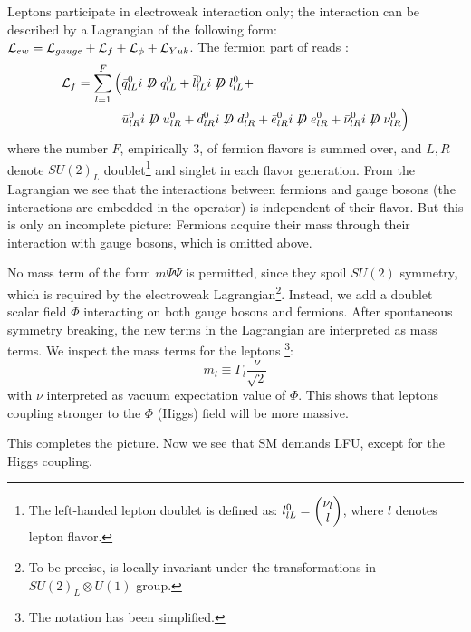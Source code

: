 Leptons participate in electroweak interaction only;
the interaction can be described by a Lagrangian of the following form:
$\mathcal{L}_{ew} = \mathcal{L}_{gauge} + \mathcal{L}_{f} + \mathcal{L}_{\phi} + \mathcal{L}_{Yuk}$.
The fermion part of  reads \cite{Langacker:2010zza}:
\begin{align*}
    \Lden{f} = \sum_{l = 1}^F \Big(
        & \bar{\spin{q}}^0_{lL} i \fsl{D} \spin{q}^0_{lL} +
          \bar{\spin{l}}^0_{lL} i \fsl{D} \spin{l}^0_{lL} + \\
        & \bar{u}^0_{lR} i \fsl{D} u^0_{lR} +
          \bar{d}^0_{lR} i \fsl{D} d^0_{lR} +
          \bar{e}^0_{lR} i \fsl{D} e^0_{lR} +
          \bar{\nu}^0_{lR} i \fsl{D} \nu^0_{lR}
    \Big)
\end{align*}
where the number $F$, empirically 3, of fermion flavors is summed over, and
$L,R$ denote $SU(2)_L$ doublet\footnote{
    The left-handed lepton doublet is defined as:
    $l^0_{lL} = \begin{pmatrix} \nu_l \\ l \end{pmatrix}$,
    where $l$ denotes lepton flavor.
}
and singlet in each flavor generation.
From the Lagrangian we see that the interactions between fermions and gauge
bosons (the interactions are embedded in the  operator) is independent
of their flavor.
But this is only an incomplete picture:
Fermions acquire their mass through their interaction with gauge bosons, which
is omitted above.

No mass term of the form $m \overline{\Psi} \Psi$ is permitted, since they
spoil $SU(2)$ symmetry, which is required by the electroweak
Lagrangian\footnote{
    To be precise,  is locally invariant under the transformations in
    $SU(2)_L \otimes U(1)$ group.
}.
Instead, we add a doublet scalar field $\Phi$ interacting on both gauge bosons
and fermions.
After spontaneous symmetry breaking, the new terms in the Lagrangian are
interpreted as mass terms.
We inspect the mass terms for the leptons \cite{Langacker:2010zza}\footnote{
    The notation has been simplified.
}:
\begin{equation*}
    m_l \equiv \Gamma_l \frac{\nu}{\sqrt{2}}
\end{equation*}
with $\nu$ interpreted as vacuum expectation value of $\Phi$.
This shows that leptons coupling stronger to the $\Phi$ (Higgs) field will be
more massive.

This completes the picture.
Now we see that SM demands LFU, except for the Higgs coupling.
